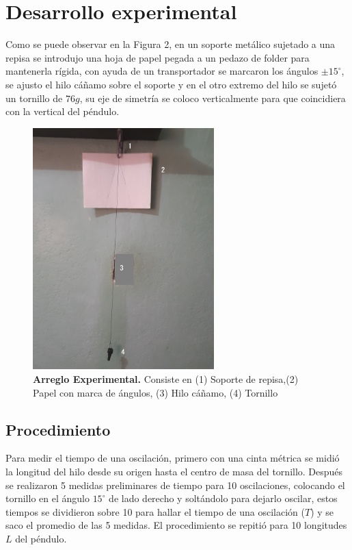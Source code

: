 \documentclass[DIV=calc, paper=a4, fontsize=11pt]{scrartcl}
\begin{document}
\section*{\textcolor{carmine}{Desarrollo experimental}}
Como se puede observar en la Figura 2, en un soporte metálico sujetado a una repisa se introdujo una hoja de papel pegada a un pedazo de folder para mantenerla rígida, con ayuda de un transportador se marcaron los ángulos $\pm 15^{\circ}$, se ajusto el hilo cáñamo sobre el soporte y en el otro extremo del hilo se sujetó un tornillo de $76g$, su eje de simetría se coloco verticalmente para que coincidiera con la vertical del péndulo.
\begin{figure}[H]
    \centering
    \includegraphics[width=7cm]{20220309_153216.jpg}
    \caption{\textbf{Arreglo Experimental.} Consiste en (1) Soporte de repisa,(2) Papel con marca de ángulos, (3) Hilo cáñamo, (4) Tornillo}
    \label{fig:my_label}
\end{figure}


\subsection*{\textcolor{carmine}{Procedimiento}}
Para medir el tiempo de una oscilación, primero con una cinta métrica se midió la longitud del hilo desde su origen hasta el centro de masa del tornillo. Después se realizaron  5 medidas preliminares de tiempo para 10 oscilaciones, colocando el tornillo en el ángulo $15^{\circ}$ de lado derecho y soltándolo para dejarlo oscilar, estos tiempos se dividieron sobre 10 para hallar el tiempo de una oscilación ($T$) y se saco el promedio de las 5 medidas. El procedimiento se repitió para 10 longitudes $L$ del péndulo. 
\end{document}
